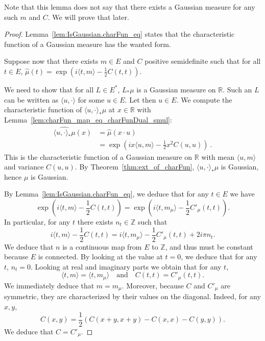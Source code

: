 Note that this lemma does not say that there exists a Gaussian measure for any such $m$ and $C$.
We will prove that later.

\begin{proof}\leanok
Lemma~\ref{lem:IsGaussian.charFun_eq} states that the characteristic function of a Gaussian measure has the wanted form.

Suppose now that there exists $m \in E$ and $C$ positive semidefinite such that for all $t \in E$, $\hat{\mu}(t) = \exp\left(i \langle t, m \rangle - \frac{1}{2} C(t, t)\right)$.

We need to show that for all $L \in E^*$, $L_*\mu$ is a Gaussian measure on $\mathbb{R}$.
Such an $L$ can be written as $\langle u, \cdot \rangle$ for some $u \in E$.
Let then $u \in E$. We compute the characteristic function of $\langle u, \cdot\rangle_*\mu$ at $x \in \mathbb{R}$ with Lemma~\ref{lem:charFun_map_eq_charFunDual_smul}:
\begin{align*}
  \widehat{\langle u, \cdot\rangle_*\mu}(x)
  &= \hat{\mu}(x \cdot u)
  \\
  &= \exp\left(i x \langle u, m \rangle - \frac{1}{2} x^2 C(u, u)\right)
  \: .
\end{align*}
This is the characteristic function of a Gaussian measure on $\mathbb{R}$ with mean $\langle u, m \rangle$ and variance $C(u, u)$.
By Theorem~\ref{thm:ext_of_charFun}, $\langle u, \cdot\rangle_*\mu$ is Gaussian, hence $\mu$ is Gaussian.

By Lemma~\ref{lem:IsGaussian.charFun_eq}, we deduce that for any $t \in E$ we have
$$\exp\left(i\langle t, m \rangle - \frac{1}{2} C(t, t)\right) = \exp\left(i\langle t, m_\mu \rangle - \frac{1}{2} C'_\mu(t, t)\right).$$
In particular, for any $t$ there exists $n_t \in \mathbb{Z}$ such that
$$i\langle t, m \rangle - \frac{1}{2} C(t, t) = i\langle t, m_\mu \rangle - \frac{1}{2} C'_\mu(t, t) + 2i\pi n_t.$$
We deduce that $n$ is a continuous map from $E$ to $\mathbb{Z}$, and thus must be constant because $E$ is connected. By looking at the value at $t = 0$, we deduce that for any $t$, $n_t = 0$. Looking at real and imaginary parts we obtain that for any $t$,
$$\langle t, m \rangle = \langle t, m_\mu \rangle \quad \text{and} \quad C(t, t) = C'_\mu(t, t).$$
We immediately deduce that $m = m_\mu$. Moreover, because $C$ and $C'_\mu$ are symmetric, they are characterized by their values on the diagonal. Indeed, for any $x, y$,
$$C(x, y) = \frac{1}{2} (C(x + y, x + y) - C(x, x) - C(y, y)).$$
We deduce that $C = C'_\mu$.
\end{proof}

